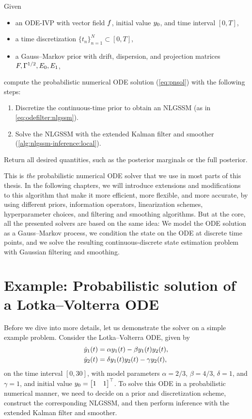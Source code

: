 \documentclass{mimosis}
\begin{document}
\begin{alg}
\label{alg:odefilter}
Given
\begin{itemize}[nosep]
\item an ODE-IVP with vector field \(\vf\),
initial value \(y_0\), and
time interval \([0, T]\),
\item a time discretization \(\{t_n\}_{n=1}^N \subset [0, T]\),
\item a Gauss--Markov prior with drift, dispersion, and projection matrices \(F, \Gamma^{1/2}, E_{0}, E_{1}\),
\end{itemize}
compute the probabilistic numerical ODE solution
(\cref{eq:pnsol})
with the following steps:
\begin{enumerate}[nosep]
\item Discretize the continuous-time prior to obtain an NLGSSM
(as in \cref{eq:odefilter:nlgssm}).
\item Solve the NLGSSM with the extended Kalman filter and smoother
(\cref{alg:nlgssm-inference:local}).
\end{enumerate}
Return all desired quantities, such as
the posterior marginals or the full posterior.
\end{alg}

This is \emph{the} probabilistic numerical ODE solver that we use in most parts of this thesis.
In the following chapters, we will introduce extensions and modifications to this algorithm that make it more efficient, more flexible, and more accurate,
by using different priors, information operators, linearization schemes, hyperparameter choices, and filtering and smoothing algorithms.
But at the core, all the presented solvers are based on the same idea:
We model the ODE solution as a Gauss--Markov process, we condition the state on the ODE at discrete time points, and we solve the resulting continuous-discrete state estimation problem with Gaussian filtering and smoothing.
\section{Example: Probabilistic solution of a Lotka--Volterra ODE}
\label{sec:org6431327}
Before we dive into more details, let us demonstrate the solver on a simple example problem.
Consider the Lotka--Volterra ODE, given by
\begin{subequations}
\begin{align}
  \dot{y}_1(t) &= \alpha y_1(t) - \beta y_1(t) y_2(t), \\
  \dot{y}_2(t) &= \delta y_1(t) y_2(t) - \gamma y_2(t),
\end{align}
\end{subequations}
on the time interval \([0, 30]\),
with model parameters \(\alpha = 2/3\), \(\beta = 4/3\), \(\delta = 1\), and \(\gamma = 1\),
and initial value \(\val_0 = \mqty[1 & 1]^\T\).
To solve this ODE in a probabilistic numerical manner, we need to decide on a prior and discretization scheme, construct the corresponding NLGSSM, and then perform inference with the extended Kalman filter and smoother.
\end{document}
